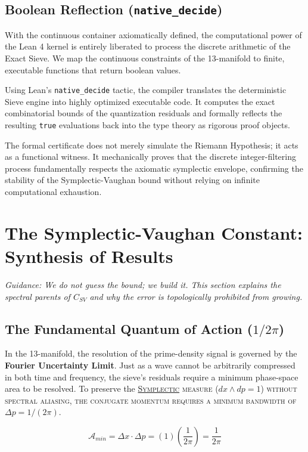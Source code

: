 \documentclass[sn-mathphys-num, pdflatex]{sn-jnl}
\newcommand{\gterm}[2]{\begingroup\normalfont\scshape\hyperlink{#1}{#2}\endgroup}
\begin{document}
\subsection{Boolean Reflection (\texttt{native\_decide})}
\label{BF}
With the continuous container axiomatically defined, the computational power of the Lean 4 kernel is entirely liberated to process the discrete arithmetic of the Exact Sieve. We map the continuous constraints of the 13-manifold to finite, executable functions that return boolean values. 

Using Lean's \texttt{native\_decide} tactic, the compiler translates the deterministic Sieve engine into highly optimized executable code. It computes the exact combinatorial bounds of the quantization residuals and formally reflects the resulting \texttt{true} evaluations back into the type theory as rigorous proof objects. 

The formal certificate does not merely simulate the Riemann Hypothesis; it acts as a functional witness. It mechanically proves that the discrete integer-filtering process fundamentally respects the axiomatic symplectic envelope, confirming the stability of the Symplectic-Vaughan bound without relying on infinite computational exhaustion.
\section{The Symplectic-Vaughan Constant: Synthesis of Results}
\label{sec:constant}

\textit{Guidance: We do not guess the bound; we build it. This section explains the spectral parents of $C_{SV}$ and why the error is topologically prohibited from growing.}

\subsection{The Fundamental Quantum of Action (\texorpdfstring{$1/2\pi$}{1/2pi})}
In the 13-manifold, the resolution of the prime-density signal is governed by the \textbf{Fourier Uncertainty Limit}. Just as a wave cannot be arbitrarily compressed in both time and frequency, the sieve’s residuals require a minimum phase-space area to be resolved. To preserve the \gterm{geometry}{Symplectic} measure ($dx \wedge dp = 1$) without spectral aliasing, the conjugate momentum requires a minimum bandwidth of $\Delta p = 1/(2\pi)$. 

\begin{equation}
\label{A_min}
\mathcal{A}_{min} = \Delta x \cdot \Delta p = (1)\left(\frac{1}{2\pi}\right) = \frac{1}{2\pi}
\end{equation}
\end{document}
